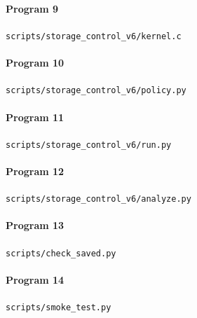 \paragraph*{Program 9} \nolinkurl{scripts/storage_control_v6/kernel.c}




\paragraph*{Program 10} \nolinkurl{scripts/storage_control_v6/policy.py}




\paragraph*{Program 11} \nolinkurl{scripts/storage_control_v6/run.py}




\paragraph*{Program 12} \nolinkurl{scripts/storage_control_v6/analyze.py}




\paragraph*{Program 13} \nolinkurl{scripts/check_saved.py}




\paragraph*{Program 14} \nolinkurl{scripts/smoke_test.py}

